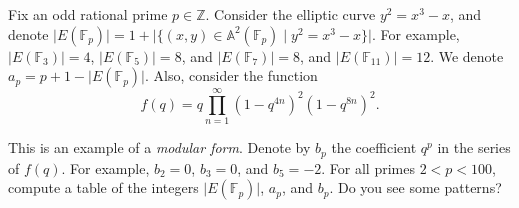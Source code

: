 \documentclass[12 pt, letterpaper]{hmcpset}
\begin{document}
\begin{problem}[Problem 1.]
	Fix an odd rational prime $p \in \mathbb{Z}$. Consider the elliptic curve $y^{2} = x^{3} - x$, and denote $\lvert E(\mathbb{F}_{p}) \rvert = 1 + \lvert \{ (x, y) \in \mathbb{A}^{2}(\mathbb{F}_{p}) \mid y^{2} = x^{3} - x \} \rvert$. For example, $\lvert E(\mathbb{F}_{3}) \rvert = 4$, $\lvert E(\mathbb{F}_{5}) \rvert = 8$, and $\lvert E(\mathbb{F}_{7}) \rvert = 8$, and $\lvert E(\mathbb{F}_{11}) \rvert = 12$. We denote $a_{p} = p + 1 - \lvert E(\mathbb{F}_{p}) \rvert$. Also, consider the function
	\[
		f(q) = q \prod_{n = 1}^{\infty} (1 - q^{4n})^{2} (1 - q^{8n})^{2}.
	\]

	This is an example of a \emph{modular form}. Denote by $b_{p}$ the coefficient $q^{p}$ in the series of $f(q)$. For example, $b_{2} = 0$, $b_{3} = 0$, and $b_{5} = -2$. For all primes $2 < p < 100$, compute a table of the integers $\lvert E(\mathbb{F}_{p}) \rvert$, $a_{p}$, and $b_{p}$. Do you see some patterns?
\end{problem}
\end{document}
